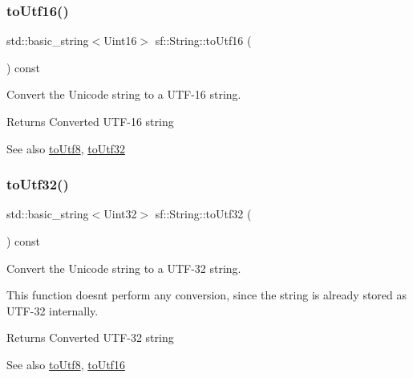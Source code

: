 \subsubsection{\texorpdfstring{to\+Utf16()}{toUtf16()}}
{\footnotesize\ttfamily std\+::basic\+\_\+string$<$Uint16$>$ sf\+::\+String\+::to\+Utf16 (\begin{DoxyParamCaption}{ }\end{DoxyParamCaption}) const}



Convert the Unicode string to a U\+T\+F-\/16 string. 

\begin{DoxyReturn}{Returns}
Converted U\+T\+F-\/16 string
\end{DoxyReturn}
\begin{DoxySeeAlso}{See also}
\hyperlink{classsf_1_1_string_a9e12e9c568994e6df06962cf49180699}{to\+Utf8}, \hyperlink{classsf_1_1_string_af1f2a3c069ce9e53fe901065cff41f68}{to\+Utf32} 
\end{DoxySeeAlso}
\mbox{\label{classsf_1_1_string_af1f2a3c069ce9e53fe901065cff41f68}} 
\subsubsection{\texorpdfstring{to\+Utf32()}{toUtf32()}}
{\footnotesize\ttfamily std\+::basic\+\_\+string$<$Uint32$>$ sf\+::\+String\+::to\+Utf32 (\begin{DoxyParamCaption}{ }\end{DoxyParamCaption}) const}



Convert the Unicode string to a U\+T\+F-\/32 string. 

This function doesn\textquotesingle{}t perform any conversion, since the string is already stored as U\+T\+F-\/32 internally.

\begin{DoxyReturn}{Returns}
Converted U\+T\+F-\/32 string
\end{DoxyReturn}
\begin{DoxySeeAlso}{See also}
\hyperlink{classsf_1_1_string_a9e12e9c568994e6df06962cf49180699}{to\+Utf8}, \hyperlink{classsf_1_1_string_a476374646d92143c0efcae8ac1fbe4ce}{to\+Utf16} 
\end{DoxySeeAlso}
\mbox{\label{classsf_1_1_string_a9e12e9c568994e6df06962cf49180699}} 
